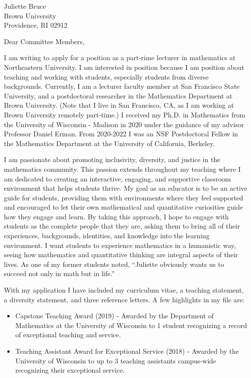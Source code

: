 \documentclass[11pt]{brownletter}
\date{November 3, 2023} %
\begin{document}
\begin{letter}{Juliette Bruce\\ 
               Brown University\\ 
               Providence, RI 02912}

\opening{Dear Committee Members,}

I am writing to apply for a position as a part-rime lecturer in mathematics at Northeastern University. I am interested in position because I am position about teaching and working with students, especially students from diverse backgrounds. Currently, I am a lecturer faculty member at San Francisco State University, and a postdoctoral researcher in the Mathematics Department at Brown University. (Note that I live in San Francisco, CA, as I am working at Brown University remotely part-time.)  I received my Ph.D. in Mathematics from the University of Wisconsin - Madison in 2020 under the guidance of my advisor Professor Daniel Erman. From 2020-2022 I was an NSF Postdoctoral Fellow in the Mathematics Department at the University of California, Berkeley.

I am passionate about promoting inclusivity, diversity, and justice in the mathematics community. This passion extends throughout my teaching where I am dedicated to creating an interactive, engaging, and supportive classroom environment that helps students thrive. My goal as an educator is to be an active guide for students, providing them with environments where they feel supported and encouraged to let their own mathematical and quantitative curiosities guide how they engage and learn. By taking this approach, I hope to engage with students as the complete people that they are, asking them to bring all of their experiences, backgrounds, identities, and knowledge into the learning environment. I want students to experience mathematics in a humanistic way, seeing how mathematics and quantitative thinking are integral aspects of their lives. As one of my former students noted, ``Juliette obviously wants us to succeed not only in math but in life.''


With my application I have included my curriculum vitae, a teaching statement, a diversity statement, and three reference letters. A few highlights in my file are:
\begin{itemize}

\item Capstone Teaching Award (2019) - Awarded by the Department of Mathematics at the University of Wisconsin to 1 student recognizing a record of exceptional teaching and service.
\item Teaching Assistant Award for Exceptional Service  (2018) - Awarded by the University of Wisconsin to up to 3 teaching assistants campus-wide recognizing their exceptional service.


\end{itemize}
\end{letter}
\end{document}
